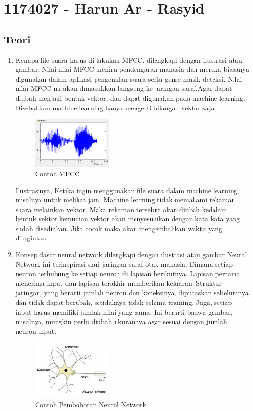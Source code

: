 \section{1174027 - Harun Ar - Rasyid}
\subsection{Teori}
\begin{enumerate}
	\item Kenapa file suara harus di lakukan MFCC. dilengkapi dengan ilustrasi atau gambar.
	\hfill\break
	Nilai-nilai MFCC meniru pendengaran manusia dan mereka biasanya digunakan dalam aplikasi pengenalan suara serta genre musik deteksi. Nilai-nilai MFCC ini akan dimasukkan langsung ke jaringan saraf.Agar dapat diubah menjadi bentuk vektor, dan dapat digunakan pada machine learning. Disebabkan machine learning hanya mengerti bilangan vektor saja.
	\begin{figure}[H]
		\includegraphics[width=4cm]{figures/1174027/6/7.png}
		\centering
		\caption{Contoh MFCC}
	\end{figure}
	Ilustrasinya, Ketika ingin menggunakan file suara dalam machine learning, misalnya untuk melihat jam. Machine learning tidak memahami rekaman suara melainkan vektor. Maka rekaman tersebut akan diubah kedalam bentuk vektor kemudian vektor akan menyesuaikan dengan kata kata yang sudah disediakan. Jika cocok maka akan mengembalikan waktu yang diinginkan
	
	\item Konsep dasar neural network dilengkapi dengan ilustrasi atau gambar
	\hfill\break
	Neural Network ini terinspirasi dari jaringan saraf otak manusia. Dimana setiap neuron terhubung ke setiap neuron di lapisan berikutnya. Lapisan pertama menerima input dan lapisan terakhir memberikan keluaran. Struktur jaringan, yang berarti jumlah neuron dan koneksinya, diputuskan sebelumnya dan tidak dapat berubah, setidaknya tidak selama training. Juga, setiap input harus memiliki jumlah nilai yang sama. Ini berarti bahwa gambar, misalnya, mungkin perlu diubah ukurannya agar sesuai dengan jumlah neuron input.
	\begin{figure}[H]
		\includegraphics[width=4cm]{figures/1174027/6/8.jpg}
		\centering
		\caption{Contoh Pembobotan Neural Network}
	\end{figure}


\end{enumerate}
